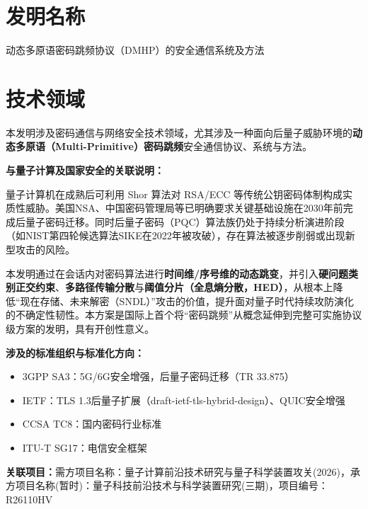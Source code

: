\documentclass[12pt,a4paper]{article}
\begin{document}
\vspace{1cm}

\section{发明名称}

动态多原语密码跳频协议（DMHP）的安全通信系统及方法

\section{技术领域}

本发明涉及密码通信与网络安全技术领域，尤其涉及一种面向后量子威胁环境的\textbf{动态多原语（Multi-Primitive）密码跳频}安全通信协议、系统与方法。

\textbf{与量子计算及国家安全的关联说明：}

量子计算机在成熟后可利用 Shor 算法对 RSA/ECC 等传统公钥密码体制构成实质性威胁。美国NSA、中国密码管理局等已明确要求关键基础设施在2030年前完成后量子密码迁移。同时后量子密码（PQC）算法族仍处于持续分析演进阶段（如NIST第四轮候选算法SIKE在2022年被攻破），存在算法被逐步削弱或出现新型攻击的风险。

本发明通过在会话内对密码算法进行\textbf{时间维/序号维的动态跳变}，并引入\textbf{硬问题类别正交约束}、\textbf{多路径传输分散}与\textbf{阈值分片（全息熵分散，HED）}，从根本上降低``现在存储、未来解密（SNDL）''攻击的价值，提升面对量子时代持续攻防演化的不确定性韧性。本方案是国际上首个将``密码跳频''从概念延伸到完整可实施协议级方案的发明，具有开创性意义。

\textbf{涉及的标准组织与标准化方向：}
\begin{itemize}[noitemsep]
    \item 3GPP SA3：5G/6G安全增强，后量子密码迁移（TR 33.875）
    \item IETF：TLS 1.3后量子扩展（draft-ietf-tls-hybrid-design）、QUIC安全增强
    \item CCSA TC8：国内密码行业标准
    \item ITU-T SG17：电信安全框架
\end{itemize}

\textbf{关联项目：}需方项目名称：量子计算前沿技术研究与量子科学装置攻关(2026)，承方项目名称(暂时)：量子科技前沿技术与科学装置研究(三期)，项目编号：R26110HV
\end{document}
